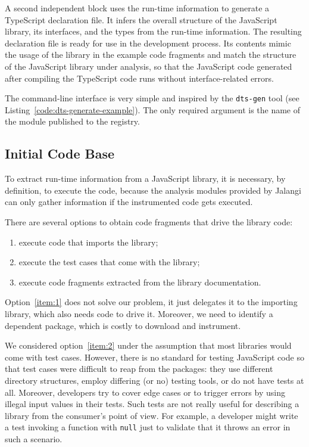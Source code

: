 \documentclass[english,cleveref,autoref,submission]{programming}
\newcommand{\coderef}[1]{Listing~\ref{#1}}
\begin{document}
A second independent block uses the run-time information to generate a
TypeScript declaration file. It infers the overall structure of the JavaScript
library, its interfaces, and the types from the run-time information. 
The resulting declaration file is ready for use in the development
process. Its contents mimic the usage of the library in the example
code fragments and match the structure of the
JavaScript library under analysis, so that the JavaScript code
generated after compiling the TypeScript code runs without
interface-related errors.

The command-line interface is very simple and inspired by the \texttt{dts-gen} tool
\cite{dts-gen} (see \coderef{code:dts-generate-example}). The only required
argument is the name of the module published to the \NPM{} registry. 


\subsection{Initial Code Base}
\label{sec:initial-code-base}

To extract run-time information from a JavaScript library, it is
necessary, by definition, to execute the code, because the
analysis modules provided by Jalangi can only gather information if the instrumented code gets executed.

There are several options to obtain code fragments that drive the
library code:
\begin{enumerate}
\item\label{item:1} execute code that imports the library;
\item\label{item:2} execute the test cases that come with the library;
\item\label{item:3} execute code fragments extracted from the library documentation.
\end{enumerate}

Option~\ref{item:1} does not solve our problem, it just delegates it
to the importing library, which also needs code to drive it. Moreover,
we need to identify a dependent package, which is costly to download and instrument.

We considered option~\ref{item:2} under the assumption that most
libraries would come with test cases. However, there is no standard
for testing JavaScript code so that test cases were difficult to reap
from the \NPM{} packages: they use different directory structures,
employ differing (or no) testing tools, or do not have tests
at all. Moreover, developers try to cover edge cases or to trigger errors by using illegal
input values in their tests. Such tests are not really useful for describing a library
from the consumer's point of view. For example, a developer might write a test invoking a
function with \texttt{null} just to validate that it throws an error
in such a scenario. 
\end{document}

